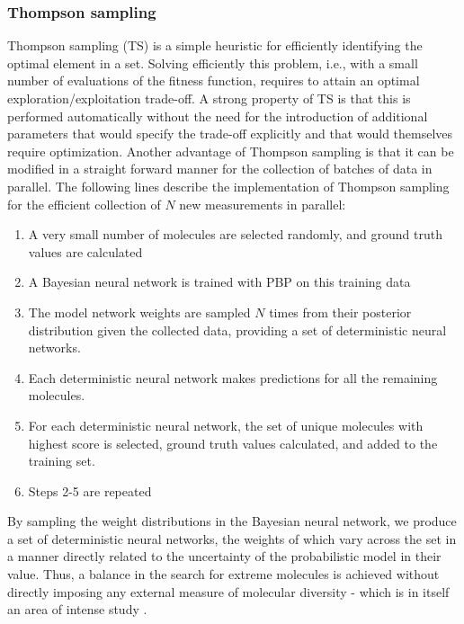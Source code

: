 \subsubsection{Thompson sampling}

Thompson sampling (TS) \cite{Thompson_1933} is a simple heuristic for efficiently identifying the optimal element in a set. Solving efficiently this problem, i.e., with a small number of evaluations of the fitness function, requires to attain an optimal exploration/exploitation trade-off. A strong property of TS  is that this is performed automatically without the need for the introduction of additional parameters that would specify the trade-off explicitly and that would themselves require optimization. Another advantage of Thompson sampling is that it can be modified in a straight forward manner for the collection of batches of data in parallel. The following lines describe the implementation of Thompson sampling for the efficient collection of $N$ new measurements in parallel:
\begin{enumerate}
\item A very small number of molecules are selected randomly, and ground truth values are calculated
\item A Bayesian neural network is trained with PBP on this training data
\item The model network weights are sampled $N$ times from their posterior distribution given the collected data, providing a set of deterministic neural networks.
\item Each deterministic neural network makes predictions for all the remaining molecules.
\item For each deterministic neural network, the set of unique molecules with highest score is selected, ground truth values calculated, and added to the training set.
\item Steps 2-5 are repeated
\end{enumerate}
By sampling the weight distributions in the Bayesian neural network, we produce a set of deterministic neural networks, the weights of which vary across the set in a manner directly related to the uncertainty of the probabilistic model in their value.  Thus, a balance in the search for extreme molecules is achieved without directly imposing any external measure of molecular diversity - which is in itself an area of intense study \cite{Maldonado_2006}.